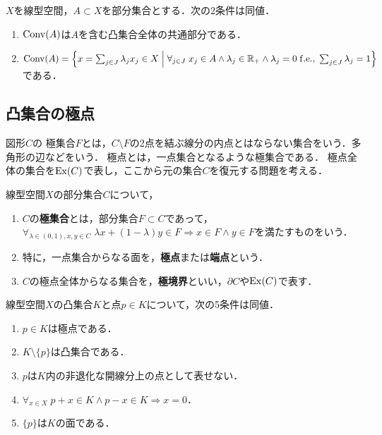 \documentclass[uplatex,dvipdfmx]{jsreport}
\begin{document}
\begin{proposition}[凸包の特徴付け]
    $X$を線型空間，$A\subset X$を部分集合とする．次の2条件は同値．
    \begin{enumerate}
        \item $\mathrm{Conv}(A)$は$A$を含む凸集合全体の共通部分である．
        \item $\mathrm{Conv}(A)=\left\{x=\sum_{j\in J}\lambda_jx_j\in X\;\middle|\;\forall_{j\in J}\;x_j\in A\land \lambda_j\in\mathbb{R}_+\land\lambda_j=0\;\mathrm{f.e.},\;\sum_{j\in J}\lambda_j=1\right\}$である．
    \end{enumerate}
\end{proposition}

\subsection{凸集合の極点}

\begin{tcolorbox}[colframe=ForestGreen, colback=ForestGreen!10!white,breakable,colbacktitle=ForestGreen!40!white,coltitle=black,fonttitle=\bfseries\sffamily,
title=]
    図形$C$の
    極集合$F$とは，$C\setminus F$の2点を結ぶ線分の内点とはならない集合をいう．多角形の辺などをいう．
    極点とは，一点集合となるような極集合である．
    極点全体の集合を$\mathrm{Ex}(C)$で表し，ここから元の集合$C$を復元する問題を考える．
\end{tcolorbox}

\begin{definition}
    線型空間$X$の部分集合$C$について，
    \begin{enumerate}
        \item $C$の\textbf{極集合}とは，部分集合$F\subset C$であって，$\forall_{\lambda\in(0,1),x,y\in C}\;\lambda x+(1-\lambda)y\in F\Rightarrow x\in F\land y\in F$を満たすものをいう．
        \item 特に，一点集合からなる面を，\textbf{極点}または\textbf{端点}という．
        \item $C$の極点全体からなる集合を，\textbf{極境界}といい，$\partial C$や$\mathrm{Ex}(C)$で表す．
    \end{enumerate}
\end{definition}

\begin{proposition}[極点の特徴付け]
    線型空間$X$の凸集合$K$と点$p\in K$について，次の5条件は同値．
    \begin{enumerate}
        \item $p\in K$は極点である．
        \item $K\setminus\{p\}$は凸集合である．
        \item $p$は$K$内の非退化な開線分上の点として表せない．
        \item $\forall_{x\in X}\;p+x\in K\land p-x\in K\Rightarrow x=0$．
        \item $\{p\}$は$K$の面である．
    \end{enumerate}
\end{proposition}
\end{document}
